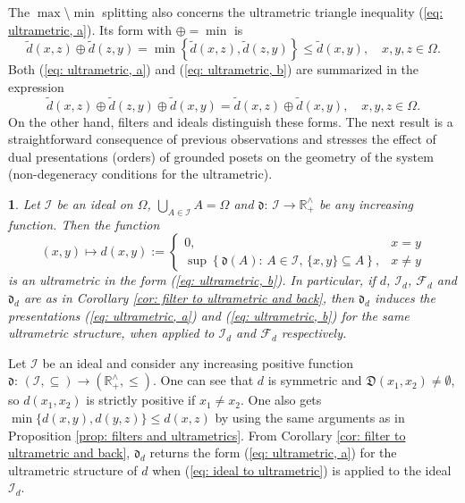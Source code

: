 \documentclass[11pt,british,reqno]{article}
\makeatletter
\numberwithin{equation}{section}
\numberwithin{figure}{section}
\numberwithin{table}{section}
\theoremstyle{definition}
\theoremstyle{definition}
\theoremstyle{plain}
\theoremstyle{plain}
\theoremstyle{remark}
\theoremstyle{plain}
\newtheorem{corollary}{\protect\corollaryname}
\numberwithin{equation}{section}
\numberwithin{figure}{section}
\numberwithin{table}{section}
\theoremstyle{plain}
\renewenvironment{proof}[1][\proofname]{\par
  \pushQED{\qed}%
  \normalfont \topsep6\p@\@plus6\p@\relax
  \list{}{%
    \settowidth{\leftmargin}{\itshape\proofname:\hskip\labelsep}%
    \setlength{\labelwidth}{0pt}%
    \setlength{\itemindent}{-\leftmargin}%
  }%
  \item[\hskip\labelsep\itshape#1\@addpunct{:}]\ignorespaces
}{%
  \popQED\endlist\@endpefalse
}
\providecommand{\corollaryname}{Corollary}
\makeatother
\begin{document}
The $\max$\textbackslash{}$\min$ splitting also concerns the ultrametric
triangle inequality (\ref{eq: ultrametric, a}). Its form with $\oplus=\min$
is 
\begin{equation}
\tilde{d}(x,z)\oplus\tilde{d}(z,y)=\min\left\{ \tilde{d}(x,z),\tilde{d}(z,y)\right\} \leq\tilde{d}(x,y),\quad x,y,z\in\Omega.\label{eq: ultrametric, b}
\end{equation}
Both (\ref{eq: ultrametric, a}) and (\ref{eq: ultrametric, b}) are
summarized in the expression 
\begin{equation}
\tilde{d}(x,z)\oplus\tilde{d}(z,y)\oplus\tilde{d}(x,y)=\tilde{d}(x,z)\oplus\tilde{d}(x,y),\quad x,y,z\in\Omega.\label{eq: ultrametric, algebraic reduction}
\end{equation}
On the other hand, filters and ideals distinguish these forms. The next result is a straightforward consequence of previous observations and stresses the effect of dual presentations (orders) of grounded posets on the geometry of the system (non-degeneracy conditions for the ultrametric). 
\begin{corollary}
\label{cor: conjugate form ultrametric} Let $\mathcal{I}$ be an
ideal on $\Omega$, ${\displaystyle \bigcup_{A\in\mathcal{I}}A=\Omega}$
and $\mathfrak{d}:\,\mathcal{I}\longrightarrow\mathbb{R}_{+}^{\wedge}$
be any increasing function. Then the function 
\begin{equation}
(x,y)\mapsto d(x,y):=\left\{ \begin{array}{cc}
0, & x=y\\
\sup\left\{ \mathfrak{d}(A):\,A\in\mathcal{I},\,\{x,y\}\subseteq A\right\} , & x\neq y
\end{array}\right.\label{eq: ideal to ultrametric, b}
\end{equation}
is an ultrametric in the form (\ref{eq: ultrametric, b}). In particular,
if $d$, $\mathcal{I}_{d}$, $\mathcal{F}_{d}$ and $\mathfrak{d}_{d}$
are as in Corollary \ref{cor: filter to ultrametric and back}, then
$\mathfrak{d}_{d}$ induces the presentations (\ref{eq: ultrametric, a})
and (\ref{eq: ultrametric, b}) for the same ultrametric structure,
when applied to $\mathcal{I}_{d}$ and $\mathcal{F}_{d}$ respectively. 
\end{corollary}
\begin{proof}
Let $\mathcal{I}$ be an ideal and consider any increasing positive
function $\mathfrak{d}:\,(\mathcal{I},\subseteq)\longrightarrow(\mathbb{R}_{+}^{\wedge},\leq)$.
One can see that $d$ is symmetric and $\mathfrak{D}(x_{1},x_{2})\neq\emptyset$,
so $d(x_{1},x_{2})$ is strictly positive if $x_{1}\neq x_{2}$. One also gets $\min\{d(x,y),d(y,z)\}\leq d(x,z)$
by using the same arguments as in Proposition \ref{prop: filters and ultrametrics}.
From Corollary \ref{cor: filter to ultrametric and back}, $\mathfrak{d}_{d}$
returns the form (\ref{eq: ultrametric, a}) for the ultrametric structure
of $d$ when (\ref{eq: ideal to ultrametric}) is applied to the ideal $\mathcal{I}_{d}$.  
\end{proof}
\end{document}
